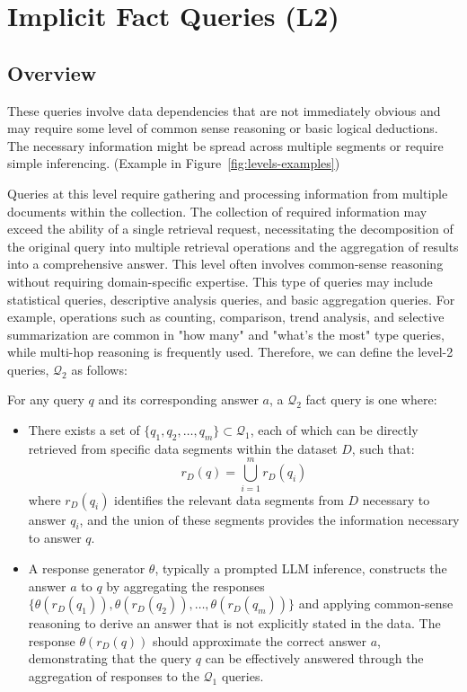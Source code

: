 \section{Implicit Fact Queries (L2)}

\subsection{Overview}
These queries involve data dependencies that are not immediately obvious and may require some level of common sense reasoning or basic logical deductions. The necessary information might be spread across multiple segments or require simple inferencing.
(Example in Figure~\ref{fig:levels-examples})


Queries at this level require gathering and processing information from multiple documents within the collection. The collection of required information may exceed the ability of a single retrieval request, necessitating the decomposition of the original query into multiple retrieval operations and the aggregation of results into a comprehensive answer. This level often involves common-sense reasoning without requiring domain-specific expertise. This type of queries may include statistical queries, descriptive analysis queries, and basic aggregation queries. For example, operations such as counting, comparison, trend analysis, and selective summarization are common in "how many" and "what's the most" type queries, while multi-hop reasoning is frequently used. Therefore, we can define the level-2 queries, $\mathcal{Q}_2$ as follows:

For any query $q$ and its corresponding answer $a$, a $\mathcal{Q}_2$ fact query is one where:
\begin{itemize}
    \item There exists a set of \firstlevel \( \{q_1, q_2, \ldots, q_m\} \subset \mathcal{Q}_1 \), each of which can be directly retrieved from specific data segments within the dataset \( D \), such that:
    \[
    r_D(q) = \bigcup_{i=1}^{m} r_D(q_i)
    \]
    where \( r_D(q_i) \) identifies the relevant data segments from \( D \) necessary to answer \( q_i \), and the union of these segments provides the information necessary to answer \( q \).
    
    \item A response generator \( \theta \), typically a prompted LLM inference, constructs the answer \( a \) to \( q \) by aggregating the responses \( \{\theta(r_D(q_1)), \theta(r_D(q_2)), \ldots, \theta(r_D(q_m))\} \) and applying common-sense reasoning to derive an answer that is not explicitly stated in the data. The response \( \theta(r_D(q)) \) should approximate the correct answer \( a \), demonstrating that the query \( q \) can be effectively answered through the aggregation of responses to the \( \mathcal{Q}_1 \) queries.
\end{itemize}

